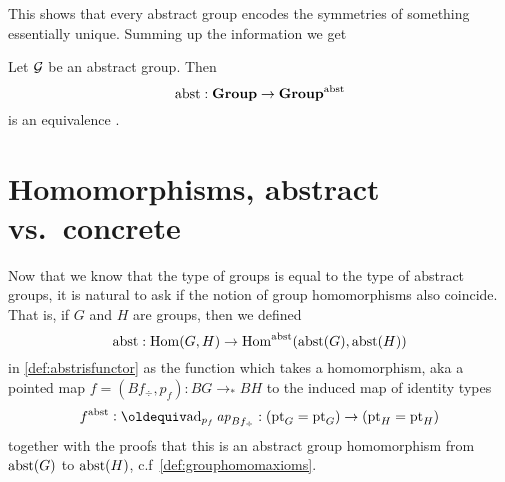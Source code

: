 This shows that every abstract group encodes the symmetries of something essentially unique.  Summing up the information we get
\begin{theorem}
  \label{lem:Groupsareidentitytypes}Let ${\mathcal G}$ be an abstract group.  
Then
$$\mathrm{abst}:\mathbf{Group}\to\mathbf{Group}^{\mathrm{abst}}$$ is an equivalence%
.
\end{theorem}

\section{Homomorphisms, abstract vs.~concrete}
\label{sec:homabsisconcr}

Now that we know that the type of groups is equal to the type of abstract groups, it is natural to ask if the notion of group homomorphisms also coincide.  That is, if $G$ and $H$ are groups, then we defined 
$$\mathrm{abst}:\mathrm{Hom}(G,H)\to\mathrm{Hom}^{\mathrm{abst}}(\mathrm{abst}(G),\mathrm{abst}(H))$$
in \cref{def:abstrisfunctor} as the function which takes a homomorphism, aka a pointed map $f=(Bf_\div,p_f):BG\to_*BH$ to the induced map of identity types 
$$f^\abstr\defequi \mathrm{ad}_{p_f}\ap{Bf_\div}:(\pt_G=\pt_G)\to(\pt_H=\pt_H)$$
 together with the proofs that this is an abstract group homomorphism from $\mathrm{abst}(G)$ to $\mathrm{abst}(H)$, c.f~\cref{def:grouphomomaxioms}.


